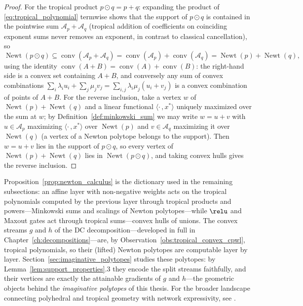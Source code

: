 \begin{proof}
For the tropical product $p \odot q = p + q$: expanding the product of \eqref{eq:tropical_polynomial} termwise shows that the support of $p \odot q$ is contained in the pointwise sum $\mathcal{A}_p + \mathcal{A}_q$ (tropical addition of coefficients on coinciding exponent sums never removes an exponent, in contrast to classical cancellation), so
\begin{equation*}
	\operatorname{Newt}(p \odot q) \subseteq \operatorname{conv}(\mathcal{A}_p + \mathcal{A}_q) = \operatorname{conv}(\mathcal{A}_p) + \operatorname{conv}(\mathcal{A}_q) = \operatorname{Newt}(p) + \operatorname{Newt}(q),
\end{equation*}
using the identity $\operatorname{conv}(A + B) = \operatorname{conv}(A) + \operatorname{conv}(B)$: the right-hand side is a convex set containing $A + B$, and conversely any sum of convex combinations $\sum_i \lambda_i u_i + \sum_j \mu_j v_j = \sum_{i,j} \lambda_i \mu_j (u_i + v_j)$ is a convex combination of points of $A + B$. For the reverse inclusion, take a vertex $w$ of $\operatorname{Newt}(p) + \operatorname{Newt}(q)$ and a linear functional $\langle \cdot\,, x^* \rangle$ uniquely maximized over the sum at $w$; by Definition~\ref{def:minkowski_sum} we may write $w = u + v$ with $u \in \mathcal{A}_p$ maximizing $\langle \cdot\,, x^* \rangle$ over $\operatorname{Newt}(p)$ and $v \in \mathcal{A}_q$ maximizing it over $\operatorname{Newt}(q)$ (a vertex of a Newton polytope belongs to the support). Then $w = u + v$ lies in the support of $p \odot q$, so every vertex of $\operatorname{Newt}(p) + \operatorname{Newt}(q)$ lies in $\operatorname{Newt}(p \odot q)$, and taking convex hulls gives the reverse inclusion.
\end{proof}

\begin{remark}\label{rem:polytope_layer_transitions}
Proposition~\ref{prop:newton_calculus} is the dictionary used in the remaining subsections: an affine layer with non-negative weights acts on the tropical polynomials computed by the previous layer through tropical products and powers---Minkowski sums and scalings of Newton polytopes---while $\relu$ and Maxout gates act through tropical sums---convex hulls of unions. The convex streams $g$ and $h$ of the DC decomposition---developed in full in Chapter~\ref{ch:decompositions}---are, by Observation~\ref{obs:tropical_convex_cpwl}, tropical polynomials, so their (lifted) Newton polytopes are computable layer by layer. Section~\ref{sec:imaginative_polytopes} studies these polytopes: by Lemma~\ref{lem:support_properties}.3 they encode the split streams faithfully, and their vertices are exactly the attainable gradients of $g$ and $h$---the geometric objects behind the \emph{imaginative polytopes} of this thesis. For the broader landscape connecting polyhedral and tropical geometry with network expressivity, see \parencite{Zhang2018,Brandenburg2024b,huchette2025deeplearningmeetspolyhedral}.
\end{remark}

